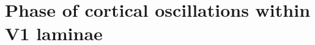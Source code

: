 

\chapter{Phase of cortical oscillations within V1 laminae}
\label{ch:plam}

\graphicspath{{Chapters/laminar-phase/figs/}}

